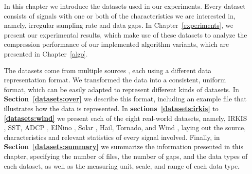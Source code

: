 







In this chapter we introduce the datasets used in our experiments. Every dataset consists of signals with one or both of the characteristics we are interested in, namely, irregular sampling rate and data gaps. In Chapter~\ref{experiments}, we present our experimental results, which make use of these datasets to analyze the compression performance of our implemented algorithm variants, which are presented in Chapter~\ref{algo}.


The datasets come from multiple sources \dataCite, each using a different data representation format. We transformed the data into a consistent, uniform format, which can be easily adapted to represent different kinds of datasets. In \textbf{Section~\ref{datasets:over}} we describe this format, including an example file that illustrates how the data is represented. In \textbf{sections~\ref{datasets:irkis}} to \textbf{\ref{datasets:wind}} we present each of the eight real-world datasets, namely, IRKIS \cite{dataset:irkis}, SST, ADCP \cite{dataset:sst1}, ElNino \cite{dataset:elnino}, Solar \cite{dataset:solar}, Hail, Tornado, and Wind \cite{dataset:spc}, laying out the source, characteristics and relevant statistics of every signal involved. Finally, in \textbf{Section~\ref{datasets:summary}} we summarize the information presented in this chapter, specifying the number of files, the number of gaps, and the data types of each dataset, as well as the measuring unit, scale, and range of each data type.

